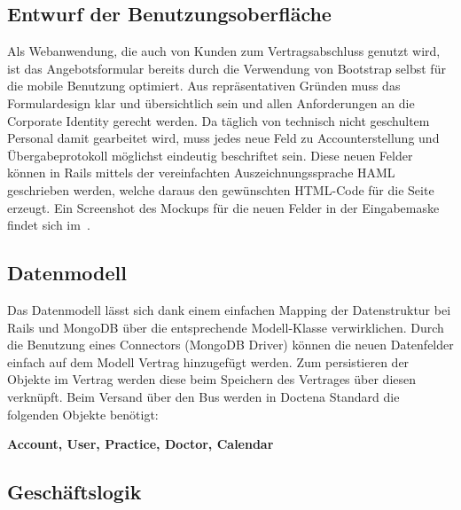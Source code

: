 \subsection{Entwurf der Benutzungsoberfläche}
\label{sec:Benutzungsoberfläche}

Als Webanwendung, die auch von Kunden zum Vertragsabschluss genutzt wird, ist das Angebotsformular bereits durch die Verwendung von Bootstrap selbst für die mobile Benutzung optimiert. Aus repräsentativen Gründen muss das Formulardesign klar und übersichtlich sein und allen Anforderungen an die Corporate Identity gerecht werden. Da täglich von technisch nicht geschultem Personal damit gearbeitet wird, muss jedes neue Feld zu Accounterstellung und Übergabeprotokoll möglichst eindeutig beschriftet sein. Diese neuen Felder können in Rails mittels der vereinfachten Auszeichnungssprache \ac{HAML} geschrieben werden, welche daraus den gewünschten \ac{HTML}-Code für die Seite erzeugt. Ein Screenshot des Mockups für die neuen Felder in der Eingabemaske findet sich im~.

\subsection{Datenmodell}
\label{sec:Datenmodell}

Das Datenmodell lässt sich dank einem einfachen Mapping der Datenstruktur bei Rails und MongoDB über die entsprechende Modell-Klasse verwirklichen. Durch die Benutzung eines Connectors (MongoDB Driver) können die neuen Datenfelder einfach auf dem Modell Vertrag hinzugefügt werden. Zum persistieren der Objekte im Vertrag werden diese beim Speichern des Vertrages über diesen verknüpft. Beim Versand über den Bus werden in Doctena Standard die folgenden Objekte benötigt:

\textbf{Account, User, Practice, Doctor, Calendar}

\subsection{Geschäftslogik}
\label{sec:Geschäftslogik}

